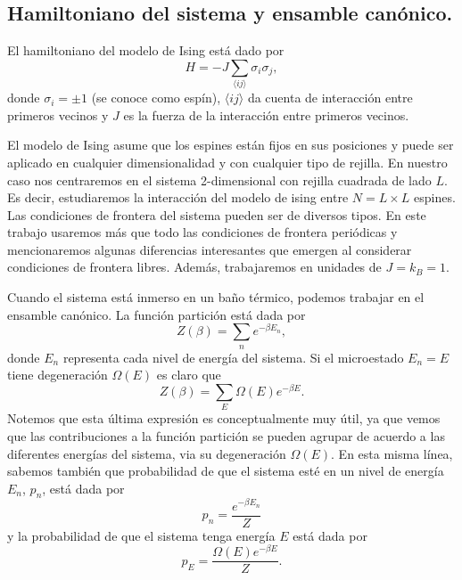 \documentclass[%
 reprint,
 amsmath,amssymb,
 aps,
 pra,
]{revtex4-2}
\begin{document}
	\subsection{Hamiltoniano del sistema y ensamble canónico.\label{subsec:teoria-hamiltoniano}}
	
	El hamiltoniano del modelo de Ising está dado por
		\begin{equation}
			H = -J\sum_{\langle ij \rangle} \sigma_i \sigma_j, \label{eq:hamiltoniano}
		\end{equation}
	donde $\sigma_i = \pm 1$ (se conoce como espín),  $\langle ij \rangle$ da cuenta de interacción entre primeros vecinos y $J$ es la fuerza de la interacción entre primeros vecinos.

	El modelo de Ising asume que los espines están fijos en sus posiciones y puede ser aplicado en cualquier dimensionalidad y con cualquier tipo de rejilla. En nuestro caso nos centraremos en el sistema 2-dimensional con rejilla cuadrada de lado $L$. Es decir, estudiaremos la interacción del modelo de ising entre $N = L \times L$ espines. Las condiciones de frontera del sistema pueden ser de diversos tipos. En este trabajo usaremos más que todo las condiciones de frontera periódicas y mencionaremos algunas diferencias interesantes que emergen al considerar condiciones de frontera libres. Además, trabajaremos en unidades de $J=k_B=1$.

	Cuando el sistema está inmerso en un baño térmico, podemos trabajar en el ensamble canónico. La función partición está dada por 
		\begin{equation}
			Z(\beta) = \sum_n  e^{-\beta E_n}, 
		\end{equation}
	donde $E_n$ representa cada nivel de energía del sistema. Si el microestado $E_n = E$ tiene degeneración $\Omega(E)$ es claro que
		\begin{equation}
			Z(\beta) = \sum_E \Omega(E) e^{-\beta E}.
		\end{equation}
	Notemos que esta última expresión es conceptualmente muy útil, ya que vemos que las contribuciones a la función partición se pueden agrupar de acuerdo a las diferentes energías del sistema, via su degeneración $\Omega(E)$. En esta misma línea, sabemos también que probabilidad de que el sistema esté en un nivel de energía $E_n$, $p_n$, está dada por
		\begin{equation}
			p_n = \frac{e^{-\beta E_n}}{Z}
		\end{equation}
	y la probabilidad de que el sistema tenga energía $E$ está dada por
		\begin{equation}
			p_E = \frac{\Omega(E) e^{-\beta E}}{Z}. \label{eq:energy_prob}
		\end{equation}
\end{document}
